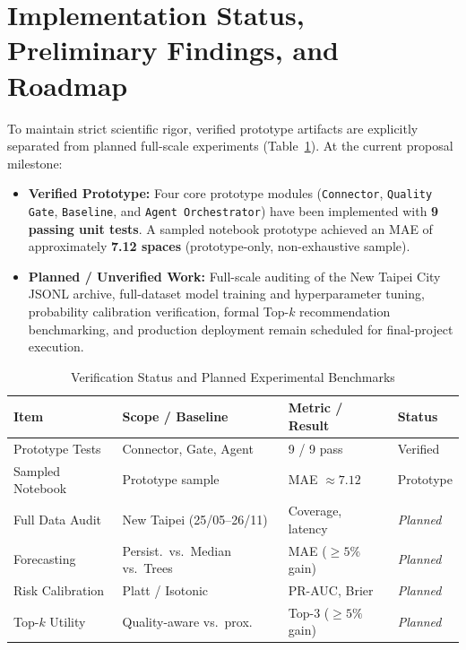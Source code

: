 \documentclass[conference,a4paper]{IEEEtran}
\newcommand{\Planned}{\textit{Planned}}
\begin{document}
\section{Implementation Status, Preliminary Findings, and Roadmap}\label{sec:status}

To maintain strict scientific rigor, verified prototype artifacts are explicitly separated from planned full-scale experiments (Table~\ref{tab:status}). At the current proposal milestone:
\begin{itemize}
    \item \textbf{Verified Prototype:} Four core prototype modules (\texttt{Connector}, \texttt{Quality Gate}, \texttt{Baseline}, and \texttt{Agent Orchestrator}) have been implemented with \textbf{9 passing unit tests}. A sampled notebook prototype achieved an MAE of approximately \textbf{7.12 spaces} (prototype-only, non-exhaustive sample).
    \item \textbf{Planned / Unverified Work:} Full-scale auditing of the New Taipei City JSONL archive, full-dataset model training and hyperparameter tuning, probability calibration verification, formal Top-$k$ recommendation benchmarking, and production deployment remain scheduled for final-project execution.
\end{itemize}

\begin{table}[!t]
\caption{Verification Status and Planned Experimental Benchmarks}
\label{tab:status}
\centering
\scriptsize
\setlength{\tabcolsep}{3pt}
\begin{tabular}{p{1.85cm}p{2.45cm}p{1.85cm}l}
\toprule
\textbf{Item} & \textbf{Scope / Baseline} & \textbf{Metric / Result} & \textbf{Status} \\
\midrule
Prototype Tests & Connector, Gate, Agent & 9 / 9 pass & Verified \\
Sampled Notebook & Prototype sample & MAE $\approx 7.12$ & Prototype \\
Full Data Audit & New Taipei (25/05--26/11) & Coverage, latency & \Planned \\
Forecasting & Persist.\ vs.\ Median vs.\ Trees & MAE ($\geq 5\%$ gain) & \Planned \\
Risk Calibration & Platt / Isotonic & PR-AUC, Brier & \Planned \\
Top-$k$ Utility & Quality-aware vs.\ prox. & Top-3 ($\geq 5\%$ gain) & \Planned \\
\bottomrule
\end{tabular}
\end{table}
\end{document}
